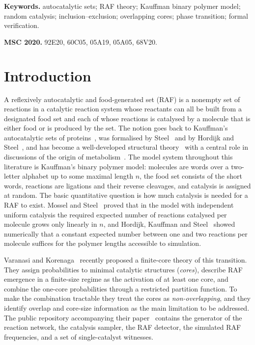 \documentclass[11pt,a4paper]{article}
\theoremstyle{plain}
\theoremstyle{definition}
\theoremstyle{remark}
\begin{document}
\noindent\textbf{Keywords.} autocatalytic sets; RAF theory; Kauffman binary polymer model; random catalysis; inclusion--exclusion; overlapping cores; phase transition; formal verification.

\medskip
\noindent\textbf{MSC 2020.} 92E20, 60C05, 05A19, 05A05, 68V20.

\section{Introduction}\label{sec:intro}

A reflexively autocatalytic and food-generated set (RAF) is a nonempty set of reactions in a catalytic reaction system whose reactants can all be built from a designated food set and each of whose reactions is catalysed by a molecule that is either food or is produced by the set. The notion goes back to Kauffman's autocatalytic sets of proteins~\cite{kauffman1986autocatalytic,kauffman1993origins}, was formalised by Steel~\cite{steel2000emergence} and by Hordijk and Steel~\cite{hordijk2004detecting}, and has become a well-developed structural theory~\cite{hordijk2012structure,steel2013minimal,hordijk2015algorithms,steel2019autocatalytic} with a central role in discussions of the origin of metabolism~\cite{hordijk2010autocatalytic,hordijk2017chasing,hordijk2018life}. The model system throughout this literature is Kauffman's binary polymer model: molecules are words over a two-letter alphabet up to some maximal length $n$, the food set consists of the short words, reactions are ligations and their reverse cleavages, and catalysis is assigned at random. The basic quantitative question is how much catalysis is needed for a RAF to exist. Mossel and Steel~\cite{mossel2005random} proved that in the model with independent uniform catalysis the required expected number of reactions catalysed per molecule grows only linearly in $n$, and Hordijk, Kauffman and Steel~\cite{hordijk2011required} showed numerically that a constant expected number between one and two reactions per molecule suffices for the polymer lengths accessible to simulation.

Varanasi and Korenaga~\cite{varanasi2026emergence} recently proposed a finite-core theory of this transition. They assign probabilities to minimal catalytic structures (\emph{cores}), describe RAF emergence in a finite-size regime as the activation of at least one core, and combine the one-core probabilities through a restricted partition function. To make the combination tractable they treat the cores as \emph{non-overlapping}, and they identify overlap and core-size information as the main limitation to be addressed. The public repository accompanying their paper~\cite{varanasi2026repository} contains the generator of the reaction network, the catalysis sampler, the RAF detector, the simulated RAF frequencies, and a set of single-catalyst witnesses.
\end{document}
